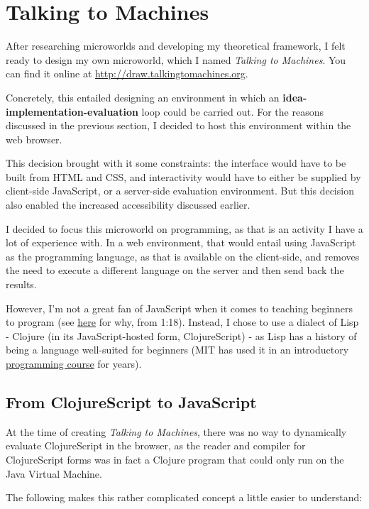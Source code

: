 \section{Talking to Machines}

After researching microworlds and developing my theoretical framework, I
felt ready to design my own microworld, which I named \emph{Talking to
Machines}. You can find it online at \url{http://draw.talkingtomachines.org}.

Concretely, this entailed designing an environment in which an
\textbf{idea-implementation-evaluation} loop could be carried out. For the
reasons discussed in the previous section, I decided to host this
environment within the web browser.

This decision brought with it some constraints: the interface would have
to be built from HTML and CSS, and interactivity would have to either be
supplied by client-side JavaScript, or a server-side evaluation
environment. But this decision also enabled the increased accessibility
discussed earlier.

I decided to focus this microworld on programming, as that is an
activity I have a lot of experience with. In a web environment, that
would entail using JavaScript as the programming language, as that is
available on the client-side, and removes the need to execute a
different language on the server and then send back the results.

However, I'm not a great fan of JavaScript when it comes to teaching
beginners to program (see \href{https://www.destroyallsoftware.com/talks/wat}{here} for why, from 1:18). Instead, I chose to use
a dialect of Lisp - Clojure (in its JavaScript-hosted form,
ClojureScript) - as Lisp has a history of being a language well-suited
for beginners (MIT has used it in an introductory \href{http://mitpress.mit.edu/sicp/course.html}{programming course} for years).

\subsection{From ClojureScript to JavaScript}

At the time of creating \emph{Talking to Machines}, there was no way to
dynamically evaluate ClojureScript in the browser, as the reader and
compiler for ClojureScript forms was in fact a Clojure program that
could only run on the Java Virtual Machine.

The following makes this rather complicated concept a little easier to
understand:

